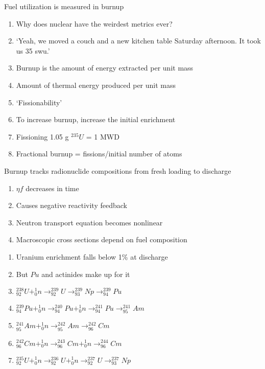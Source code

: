 \documentclass[aspectratio=1610,pdftex,dvipsnames,compress,xcolor={dvipsnames}]{beamer}
\newcommand{\acs}{\acrshort} %
\begin{document}
\begin{frame}{Fuel utilization is measured in burnup}
    \begin{enumerate}[series=outerlist,topsep=0pt,itemsep=11pt,leftmargin=*,label=(\arabic*)]
        \item[]Why does nuclear have the weirdest metrics ever?
        \item[]`Yeah, we moved a couch and a new kitchen table Saturday afternoon. It took us 35 \acs{swu}.'
        \item[]Burnup is the amount of energy extracted per unit mass
        \item[]Amount of thermal energy produced per unit mass
        \item[]`Fissionability'
        \item[]To increase burnup, increase the initial enrichment
        \item[]Fissioning 1.05 g $^{235}U$ = 1 MWD
        \item[]Fractional burnup = fissions/initial number of atoms
    \end{enumerate}
\end{frame}


\begin{frame}{Burnup tracks radionuclide compositions from fresh loading to discharge}
    \begin{enumerate}[series=outerlist,topsep=0pt,itemsep=21pt,leftmargin=*,label=(\arabic*)]
        \item[]$\eta f$ decreases in time
        \item[]Causes negative reactivity feedback
        \item[]Neutron transport equation becomes nonlinear
        \item[]Macroscopic cross sections depend on fuel composition
    \end{enumerate}
\end{frame}


\begin{frame}{}
    \begin{enumerate}[series=outerlist,topsep=0pt,itemsep=15pt,leftmargin=*,label=(\arabic*)]
        \item[]Uranium enrichment falls below 1\% at discharge
        \item[]But $Pu$ and actinides make up for it
        \item[]$^{238}_{92}U + ^1_0n \rightarrow ^{239}_{92}U \rightarrow ^{239}_{93}Np \rightarrow ^{239}_{94}Pu$
        \item[]$^{239}_{94}Pu + ^1_0n \rightarrow ^{240}_{94}Pu + ^1_0n \rightarrow ^{241}_{94}Pu \rightarrow ^{241}_{95}Am$
        \item[]$^{241}_{95}Am + ^1_0n \rightarrow ^{242}_{95}Am \rightarrow ^{242}_{96}Cm$
        \item[]$^{242}_{96}Cm + ^1_0n \rightarrow ^{243}_{96}Cm + ^1_0n \rightarrow ^{244}_{96}Cm$
        \item[]$^{235}_{92}U + ^1_0n \rightarrow ^{236}_{92}U + ^1_0n \rightarrow ^{237}_{92}U \rightarrow ^{237}_{93}Np$
    \end{enumerate}
\end{frame}
\end{document}
